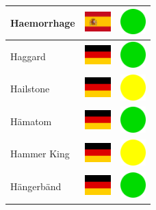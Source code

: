 \documentclass[12pt, a4paper, twoside]{report}
\begin{document}
\begin{center}
\begin{longtable}{|p{5cm}|p{2cm}|p{2cm}|}
 Haemorrhage                                                & \includegraphics[width=1cm]{../4x3/es} &   \includegraphics[width=1cm]{../likes/y} \\ \hline
 Haggard                                                    & \includegraphics[width=1cm]{../4x3/de} &   \includegraphics[width=1cm]{../likes/y} \\ \hline
 Hailstone                                                  & \includegraphics[width=1cm]{../4x3/de} &   \includegraphics[width=1cm]{../likes/m} \\ \hline
 Hämatom                                                    & \includegraphics[width=1cm]{../4x3/de} &   \includegraphics[width=1cm]{../likes/y} \\ \hline
 Hammer King                                                & \includegraphics[width=1cm]{../4x3/de} &   \includegraphics[width=1cm]{../likes/m} \\ \hline
 Hängerbänd                                                 & \includegraphics[width=1cm]{../4x3/de} &   \includegraphics[width=1cm]{../likes/y} \\ \hline

\end{longtable}
\end{center}
\end{document}
